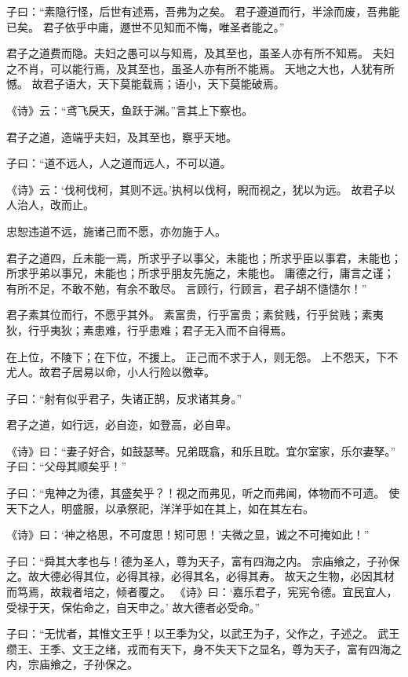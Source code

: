 \documentclass[twoside,openany]{book}
\begin{document}
\begin{pinyinscope}
子曰：“素隐行怪，后世有述焉，吾弗为之矣。
君子遵道而行，半涂而废，吾弗能已矣。
君子依乎中庸，遯世不见知而不悔，唯圣者能之。”

君子之道费而隐。夫妇之愚可以与知焉，及其至也，虽圣人亦有所不知焉。
夫妇之不肖，可以能行焉，及其至也，虽圣人亦有所不能焉。
天地之大也，人犹有所憾。
故君子语大，天下莫能载焉；语小，天下莫能破焉。

《诗》云：“鸢飞戾天，鱼跃于渊。”言其上下察也。

君子之道，造端乎夫妇，及其至也，察乎天地。

子曰：“道不远人，人之道而远人，不可以道。

《诗》云：‘伐柯伐柯，其则不远。’执柯以伐柯，睨而视之，犹以为远。
故君子以人治人，改而止。

忠恕违道不远，施诸己而不愿，亦勿施于人。

君子之道四，丘未能一焉，所求乎子以事父，未能也；所求乎臣以事君，未能也；所求乎弟以事兄，未能也；所求乎朋友先施之，未能也。
庸德之行，庸言之谨；有所不足，不敢不勉，有余不敢尽。
言顾行，行顾言，君子胡不慥慥尔！”

君子素其位而行，不愿乎其外。
素富贵，行乎富贵；素贫贱，行乎贫贱；素夷狄，行乎夷狄；素患难，行乎患难；君子无入而不自得焉。

在上位，不陵下；在下位，不援上。
正己而不求于人，则无怨。
上不怨天，下不尤人。故君子居易以命，小人行险以徼幸。

子曰：“射有似乎君子，失诸正鹄，反求诸其身。”

君子之道，如行远，必自迩，如登高，必自卑。

《诗》曰：“妻子好合，如鼓瑟琴。兄弟既翕，和乐且耽。宜尔室家，乐尔妻孥。”
子曰：“父母其顺矣乎！”

子曰：“鬼神之为德，其盛矣乎？！视之而弗见，听之而弗闻，体物而不可遗。
使天下之人，明盛服，以承祭祀，洋洋乎如在其上，如在其左右。

《诗》曰：‘神之格思，不可度思！矧可思！’夫微之显，诚之不可掩如此！”

子曰：“舜其大孝也与！德为圣人，尊为天子，富有四海之内。
宗庙飨之，子孙保之。故大德必得其位，必得其禄，必得其名，必得其寿。
故天之生物，必因其材而笃焉，故栽者培之，倾者覆之。
《诗》曰：‘嘉乐君子，宪宪令德。宜民宜人，受禄于天，保佑命之，自天申之。’
故大德者必受命。”

子曰：“无忧者，其惟文王乎！以王季为父，以武王为子，父作之，子述之。
武王缵王、王季、文王之绪，戎而有天下，身不失天下之显名，尊为天子，富有四海之内，宗庙飨之，子孙保之。


\end{pinyinscope}
\end{document}
